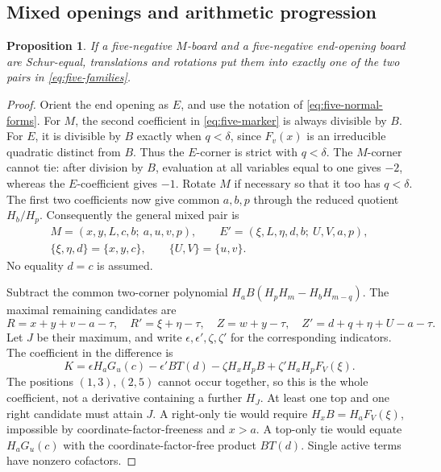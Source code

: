 \documentclass[11pt,a4paper]{amsart}
\numberwithin{equation}{section}
\theoremstyle{plain}
\newtheorem{proposition}[theorem]{Proposition}
\theoremstyle{definition}
\begin{document}
\subsection{Mixed openings and arithmetic progression}

\begin{proposition}\label{prop:five-mixed-opening}
If a five-negative \(M\)-board and a five-negative end-opening board
are Schur-equal, translations and rotations put them into exactly one
of the two pairs in \eqref{eq:five-families}.  
\end{proposition}

\begin{proof}
Orient the end opening as \(E\), and use the notation of
\eqref{eq:five-normal-forms}.  For \(M\), the second coefficient in
\eqref{eq:five-marker} is always divisible by \(B\).  For \(E\),
it is divisible by \(B\) exactly when \(q<\delta\), since
\(F_v(x)\) is an irreducible quadratic distinct from \(B\).  
Thus the \(E\)-corner is strict with \(q<\delta\).  The \(M\)-corner
cannot tie: after division by \(B\), evaluation at all variables equal
to one gives \(-2\), whereas the \(E\)-coefficient gives \(-1\).  
Rotate \(M\) if necessary so that it too has \(q<\delta\).  
The first two coefficients now give common \(a,b,p\) through the
reduced quotient \(H_b/H_p\).  Consequently the general mixed pair is
\begin{equation}\label{eq:cross-candidates}
 \begin{gathered}
 M=(x,y,L,c,b;\ a,u,v,p),\qquad
 E'=(\xi,L,\eta,d,b;\ U,V,a,p),\\
 \{\xi,\eta,d\}=\{x,y,c\},\qquad \{U,V\}=\{u,v\}.
 \end{gathered}
\end{equation}
No equality \(d=c\) is assumed.  

Subtract the common two-corner polynomial
\(H_aB(H_pH_m-H_bH_{m-q})\).  The maximal remaining candidates are
\[
 R=x+y+v-a-\tau,\quad R'=\xi+\eta-\tau,\quad
 Z=w+y-\tau,\quad Z'=d+q+\eta+U-a-\tau.
\]
Let \(J\) be their maximum, and write
\(\epsilon,\epsilon',\zeta,\zeta'\) for the corresponding indicators.  
The coefficient in the difference is
\begin{equation}\label{eq:five-mixed-coefficient}
 K=\epsilon H_aG_u(c)-\epsilon'BT(d)
       -\zeta H_xH_pB+\zeta'H_aH_pF_V(\xi).
\end{equation}
The positions \((1,3),(2,5)\) cannot occur together, so this is the
whole coefficient, not a derivative containing a further \(H_J\).  
At least one top and one right candidate must attain \(J\).  A
right-only tie would require \(H_xB=H_aF_V(\xi)\), impossible by
coordinate-factor-freeness and \(x>a\).  A top-only tie would equate
\(H_aG_u(c)\) with the coordinate-factor-free product \(BT(d)\).  
Single active terms have nonzero cofactors.  


\end{proof}
\end{document}
